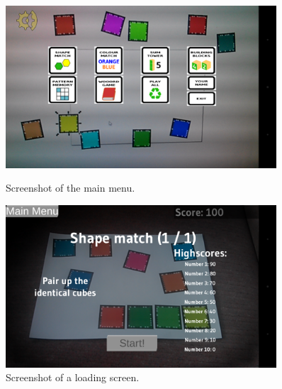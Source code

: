 
\begin{figure}[h]
	\centering
	\begin{minipage}{.5\textwidth}
		\capstart
		\centering
		\includegraphics[width=0.9\textwidth]{images/main_menu.png}
		\vspace{-10pt}
		\caption{Screenshot of the main menu.}
		\label{fig:main_menu}
	\end{minipage}%
	\begin{minipage}{.5\textwidth}
		\capstart
		\centering
		\includegraphics[width=0.9\textwidth]{images/loading_screen.png}
		\vspace{-10pt}
		\caption{Screenshot of a loading screen.}
		\label{fig:loading_screen}
	\end{minipage}%
\end{figure}



